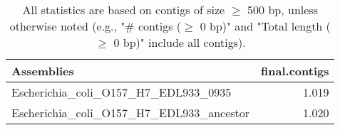 \documentclass[12pt,a4paper]{article}
\begin{document}
\begin{table}[ht]
\begin{center}
\caption{All statistics are based on contigs of size $\geq$ 500 bp, unless otherwise noted (e.g., "\# contigs ($\geq$ 0 bp)" and "Total length ($\geq$ 0 bp)" include all contigs).}
\begin{tabular}{|l*{1}{|r}|}
\hline
Assemblies & final.contigs \\ \hline
Escherichia\_coli\_O157\_H7\_EDL933\_0935 & 1.019 \\ \hline
Escherichia\_coli\_O157\_H7\_EDL933\_ancestor & 1.020 \\ \hline
\end{tabular}
\end{center}
\end{table}
\end{document}
